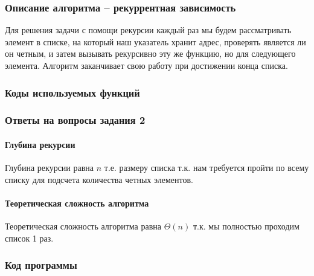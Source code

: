 \documentclass[a4paper, 14pt]{extarticle}
\begin{document}
\subsubsection{Описание алгоритма – рекуррентная зависимость}
Для решения задачи с помощи рекурсии каждый раз мы будем рассматривать элемент
в списке, на который наш указатель хранит адрес, проверять является ли он четным,
и затем вызывать рекурсивно эту же функцию, но для следующего элемента.
Алгоритм заканчивает свою работу при достижении конца списка.
\subsubsection{Коды используемых функций}

\subsubsection{Ответы на вопросы задания 2}
\paragraph{Глубина рекурсии}
Глубина рекурсии равна $n$ т.е. размеру списка т.к. нам требуется пройти
по всему списку для подсчета количества четных элементов.
\paragraph{Теоретическая сложность алгоритма}
Теоретическая сложность алгоритма равна $\Theta(n)$ т.к. мы полностью
проходим список 1 раз.
\subsubsection{Код программы}

\newpage
\end{document}
